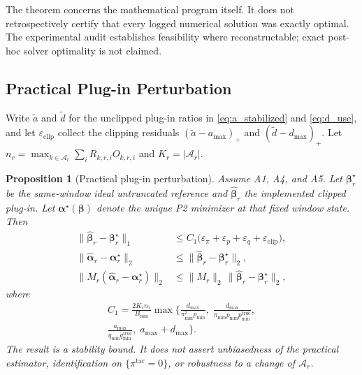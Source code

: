 \documentclass[letterpaper,journal]{IEEEtran}
\newtheorem{proposition}{Proposition}
\begin{document}
The theorem concerns the mathematical program itself.  It does not
retrospectively certify that every logged numerical solution was exactly
optimal.  The experimental audit establishes feasibility where reconstructable;
exact post-hoc solver optimality is not claimed.

\subsection{Practical Plug-in Perturbation}
\label{subsec:prop_plugin}

Write $\widetilde a$ and $\widetilde d$ for the unclipped plug-in ratios
in \eqref{eq:a_stabilized} and \eqref{eq:d_use}, and let
$\varepsilon_{\mathrm{clip}}$ collect the clipping residuals
$(\widetilde a-a_{\max})_+$ and $(\widetilde d-d_{\max})_+$.
Let $n_r=\max_{k\in\mathcal{A}_r}\sum_i R_{k,r,i}O_{k,r,i}$ and
$K_r=|\mathcal{A}_r|$.

\begin{proposition}[Practical plug-in perturbation]
\label{prop:practical_plugin}
Assume A1, A4, and A5.  Let $\boldsymbol\beta_r^\star$ be the
same-window ideal untruncated reference and
$\widehat{\boldsymbol\beta}_r$ the implemented clipped plug-in.  Let
$\boldsymbol\alpha^\star(\boldsymbol\beta)$ denote the unique P2 minimizer
at that fixed window state.  Then
\begin{align}
\bigl\|\widehat{\boldsymbol\beta}_r-\boldsymbol\beta_r^\star\bigr\|_1
&\le
C_1\bigl(\varepsilon_\pi+\varepsilon_p+\varepsilon_q+\varepsilon_{\mathrm{clip}}\bigr),
\label{eq:g4_beta}\\
\bigl\|\widehat{\boldsymbol\alpha}_r-\boldsymbol\alpha_r^\star\bigr\|_2
&\le
\bigl\|\widehat{\boldsymbol\beta}_r-\boldsymbol\beta_r^\star\bigr\|_2,
\label{eq:g4_alpha}\\
\bigl\|M_r(\widehat{\boldsymbol\alpha}_r-\boldsymbol\alpha_r^\star)\bigr\|_2
&\le
\|M_r\|_2\,
\bigl\|\widehat{\boldsymbol\beta}_r-\boldsymbol\beta_r^\star\bigr\|_2,
\label{eq:g4_comp}
\end{align}
where
\begin{multline}
C_1
=
\frac{2K_r n_r}{B_{\min}}
\max\Biggl\{
\frac{d_{\max}}{\pi_{\min}^2 p_{\min}},\;
\frac{d_{\max}}{\pi_{\min}p_{\min}p_{\min}^{\mathrm{true}}},\\
\frac{a_{\max}}{q_{\min}q_{\min}^{\mathrm{true}}},\;
a_{\max}+d_{\max}
\Biggr\}.
\label{eq:g4_c1}
\end{multline}
The result is a stability bound.  It does not assert unbiasedness of the
practical estimator, identification on $\{\pi^{\mathrm{tar}}=0\}$, or
robustness to a change of $\mathcal{A}_r$.
\end{proposition}
\end{document}
